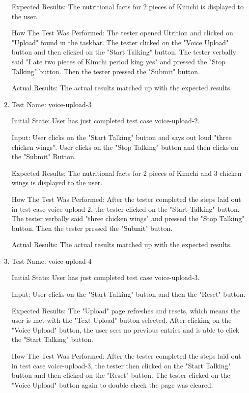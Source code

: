 \documentclass[12pt, titlepage]{article}
\begin{document}
\begin{enumerate}
		Expected Results: The nutritional facts for 2 pieces of Kimchi is displayed to the user.
		
		How The Test Was Performed: The tester opened Utrition and clicked on "Upload" found in the taskbar. The tester clicked on the "Voice Upload" button and then clicked on the "Start Talking" button. The tester verbally said "I ate two pieces of Kimchi period king yes" and pressed the "Stop Talking" button. Then the tester pressed the "Submit" button.
		
		Actual Results: The actual results matched up with the expected results.
		
		\item{Test Name: voice-upload-3}
		
		Initial State: User has just completed test case voice-upload-2.
		
		Input: User clicks on the "Start Talking" button and says out loud "three chicken wings". User clicks on the "Stop Talking" button and then clicks on the "Submit" Button.
		
		Expected Results: The nutritional facts for 2 pieces of Kimchi and 3 chicken wings is displayed to the user.
		
		How The Test Was Performed: After the tester completed the steps laid out in test case voice-upload-2, the tester clicked on the "Start Talking" button. The tester verbally said "three chicken wings" and pressed the "Stop Talking" button. Then the tester pressed the "Submit" button.
		
		Actual Results: The actual results matched up with the expected results.
		
		\item{Test Name: voice-upload-4}
		
		Initial State: User has just completed test case voice-upload-3.
		
		Input: User clicks on the "Start Talking" button and then the "Reset" button.
		
		Expected Results: The "Upload" page refreshes and resets, which means the user is met with the "Text Upload" button selected. After clicking on the "Voice Upload" button, the user sees no previous entries and is able to click the "Start Talking" button.
		
		How The Test Was Performed: After the tester completed the steps laid out in test case voice-upload-3, the tester then clicked on the "Start Talking" button and then clicked on the "Reset" button. The tester clicked on the "Voice Upload" button again to double check the page was cleared.
		

\end{enumerate}
\end{document}
